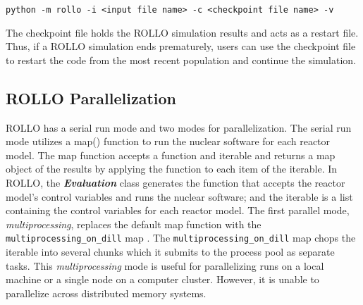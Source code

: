 \noindent
\texttt{python -m rollo -i <input file name> -c <checkpoint file name> -v}

The checkpoint file holds the \gls{ROLLO} simulation results and acts as a restart file.
Thus, if a \gls{ROLLO} simulation ends prematurely, users can use the checkpoint file to 
restart the code from the most recent population and continue the simulation. 

\subsection{ROLLO Parallelization}
\label{sec:rollo_parallel}
\gls{ROLLO} has a serial run mode and two modes for parallelization. 
The serial run mode utilizes a map() function to run the nuclear software for each 
reactor model.
The map function accepts a function and iterable and returns a map object of the results 
by applying the function to each item of the iterable. 
In \gls{ROLLO}, the \textbf{\textit{Evaluation}} class generates the function 
that accepts the reactor model's control variables and runs the nuclear software;
and the iterable is a list containing the control variables for each reactor model. 
The first parallel mode, \textit{multiprocessing}, replaces the default map function 
with the \texttt{multiprocessing\_on\_dill} map \cite{smallshire_multiprocessing_on_dill_nodate}.
The \texttt{multiprocessing\_on\_dill} map chops the iterable into several chunks 
which it submits to the process pool as separate tasks.
This \textit{multiprocessing} mode is useful for parallelizing runs on a local machine or 
a single node on a computer cluster. 
However, it is unable to parallelize across distributed memory systems.

